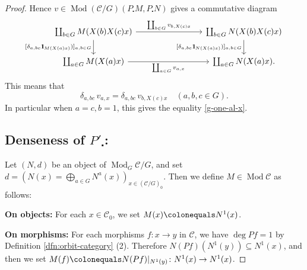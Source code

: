 \documentclass{surv-l}
\numberwithin{equation}{chapter}
\numberwithin{figure}{chapter}
\theoremstyle{plain}
\theoremstyle{definition}
\theoremstyle{remark}
\newcommand{\id}{1\kern-.25em{\text{{\rm l}}}}
\newcommand{\Ar}[3]{\ar[from={#1}, to={#2}, #3]}
\DeclareMathOperator{\Mod}{Mod}
\begin{document}
\begin{proof}
Hence $v\in \Mod ({\mathcal{C}}/G)(P_{\centerdot} M, P_{\centerdot} N)$ gives a commutative diagram
\[
\begin{tikzcd}[column sep=8em]
\coprod_{b\in G}M(X(b)X(c)x) & \coprod_{b\in G}N(X(b)X(c)x)\\
\coprod_{a\in G}M(X(a) x) & \coprod_{a\in G}N(X(a) x).
\Ar{1-1}{2-1}{"{[\delta_{a,bc}\id_{M(X(a)x)})]_{a,b\in G}}" '}
\Ar{1-2}{2-2}{"{[\delta_{a,bc}\id_{N(X(a)x)})]_{a,b\in G}}" '}
\Ar{1-1}{1-2}{"\coprod_{b\in G}v_{b,X(c)x}"}
\Ar{2-1}{2-2}{"\coprod_{a\in G}v_{a,x}" '}
\end{tikzcd}
\]
This means that
\[
\delta_{a,bc}\, v_{a,x} = \delta_{a,bc}\, v_{b,X(c)x} \quad (a, b, c \in G).
\]
In particular when $a = c, b = 1$, this gives the equality \eqref{g-one-al-x}.


\subsection*{Denseness of $P'_{\centerdot}$:}
Let $(N, d)$ be an object of $\Mod_{G}{\mathcal{C}}/G$, and set
$d = (N(x) = \bigoplus_{a\in G} N^a(x))_{x\in ({\mathcal{C}}/G)_0}$.
Then we define $M \in \Mod{\mathcal{C}}$ as follows:

{\bf On objects:} For each $x\in {\mathcal{C}}_0$, we set $M(x)\colonequals  N^{1}(x)$.

{\bf On morphisms:}
For each morphisms $f\colon x \to y$ in ${\mathcal{C}}$,
we have $\deg P f =1$ by Definition \ref{dfn:orbit-category} (2).
Therefore $N(P f)(N^1(y)) \subseteq N^1(x)$, and then
we set
$M(f)\colonequals  N(P f)|_{N^{1}(y)}\colon N^{1}(x) \to N^{1}(x)$.


\end{proof}
\end{document}
